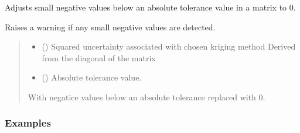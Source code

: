 \documentclass[letterpaper,10pt,english]{sphinxmanual}
\begin{document}
\begin{fulllineitems}
\label{\detokenize{misc:glomar_gridding.utils.adjust_small_negative}}
\pysigstartsignatures
\pysiglinewithargsret
{}
{\sphinxparamcomma {}}
{}
\pysigstopsignatures
\sphinxAtStartPar
Adjusts small negative values below an absolute tolerance value in a matrix
to 0.

\sphinxAtStartPar
Raises a warning if any small negative values are detected.
\begin{quote}\begin{description}
\begin{itemize}
\item {}
\sphinxAtStartPar
{} () \textendash{} Squared uncertainty associated with chosen kriging method
Derived from the diagonal of the matrix

\item {}
\sphinxAtStartPar
{} () \textendash{} Absolute tolerance value.

\end{itemize}

\sphinxAtStartPar
With negatice values below an absolute tolerance replaced with 0.

\sphinxAtStartPar
{}

\end{description}\end{quote}
\subsubsection*{Examples}

\begin{sphinxVerbatim}[commandchars=\\\{\}]
  \PYG{p}{[}\PYG{p}{[} \PYG{p}{]} \PYG{p}{[} \PYG{p}{]}\PYG{p}{]}
 
\PYG{g+go}{array([[1., 0.],}
\PYG{g+go}{       [0., 1.]])}
\end{sphinxVerbatim}

\end{fulllineitems}
\end{document}
